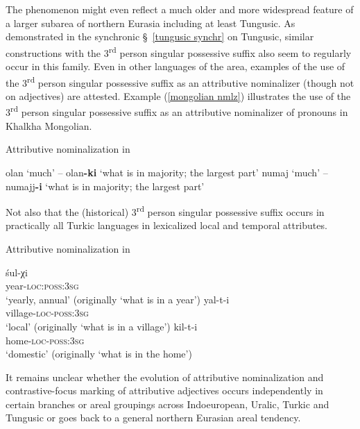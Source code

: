 The phenomenon might even reflect a much older and more widespread feature of a larger subarea of northern Eurasia including at least Tungusic. As demonstrated in the synchronic \S~\ref{tungusic synchr} on Tungusic, similar constructions with the 3\textsuperscript{rd} person singular possessive suffix also seem to regularly occur in this family. Even in other languages of the area, examples of the use of the 3\textsuperscript{rd} person singular possessive suffix as an attributive nominalizer (though not on adjectives) are attested. Example (\ref{mongolian nmlz}) illustrates the use of the 3\textsuperscript{rd} person singular possessive suffix as an attributive nominalizer of pronouns in Khalkha Mongolian.
\begin{exe} \label{mongolian nmlz}
\ex Attributive nominalization in \\
\begin{xlist}
\ex	olan ‘much’ – olan\textbf{-ki} ‘what is in majority; the largest part’
\ex	numaj ‘much’ – numajj\textbf{-i} ‘what is in majority; the largest part’
\end{xlist}
\end{exe}
Not also that the (historical) 3\textsuperscript{rd} person singular possessive suffix occurs in practically all Turkic languages in lexicalized local and temporal attributes. 
\begin{exe}
\ex Attributive nominalization in \\
\begin{xlist}
\ex
\gll	śul-χi\\
	year-\textsc{loc:poss:3sg}\\
\glt	‘yearly, annual’ (originally ‘what is in a year’)
\ex
\gll	yal-t-i\\
	village-\textsc{loc-poss:3sg}\\
\glt	‘local’ (originally ‘what is in a village’)
\ex
\gll	kil-t-i\\
	home-\textsc{loc-poss:3sg}\\
\glt	‘domestic’ (originally ‘what is in the home’)
\end{xlist}
\end{exe}
It remains unclear whether the evolution of attributive nominalization and contrastive-focus marking of attributive adjectives occurs independently in certain branches or areal groupings across Indoeuropean, Uralic, Turkic and Tungusic or goes back to a general northern Eurasian areal tendency.

